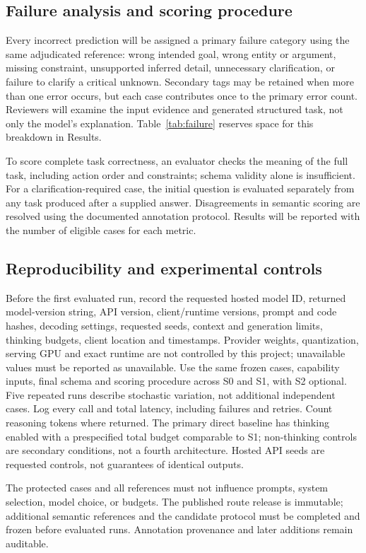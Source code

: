 \documentclass[10pt,conference]{IEEEtran}
\begin{document}
\subsection{Failure analysis and scoring procedure}
Every incorrect prediction will be assigned a primary failure category using the same adjudicated reference: wrong intended goal, wrong entity or argument, missing constraint, unsupported inferred detail, unnecessary clarification, or failure to clarify a critical unknown. Secondary tags may be retained when more than one error occurs, but each case contributes once to the primary error count. Reviewers will examine the input evidence and generated structured task, not only the model's explanation. Table~\ref{tab:failure} reserves space for this breakdown in Results.

To score complete task correctness, an evaluator checks the meaning of the full task, including action order and constraints; schema validity alone is insufficient. For a clarification-required case, the initial question is evaluated separately from any task produced after a supplied answer. Disagreements in semantic scoring are resolved using the documented annotation protocol. Results will be reported with the number of eligible cases for each metric.

\subsection{Reproducibility and experimental controls}
Before the first evaluated run, record the requested hosted model ID, returned model-version string, API version, client/runtime versions, prompt and code hashes, decoding settings, requested seeds, context and generation limits, thinking budgets, client location and timestamps. Provider weights, quantization, serving GPU and exact runtime are not controlled by this project; unavailable values must be reported as unavailable. Use the same frozen cases, capability inputs, final schema and scoring procedure across S0 and S1, with S2 optional. Five repeated runs describe stochastic variation, not additional independent cases. Log every call and total latency, including failures and retries. Count reasoning tokens where returned. The primary direct baseline has thinking enabled with a prespecified total budget comparable to S1; non-thinking controls are secondary conditions, not a fourth architecture. Hosted API seeds are requested controls, not guarantees of identical outputs.

The protected cases and all references must not influence prompts, system selection, model choice, or budgets. The published route release is immutable; additional semantic references and the candidate protocol must be completed and frozen before evaluated runs. Annotation provenance and later additions remain auditable.
\end{document}
